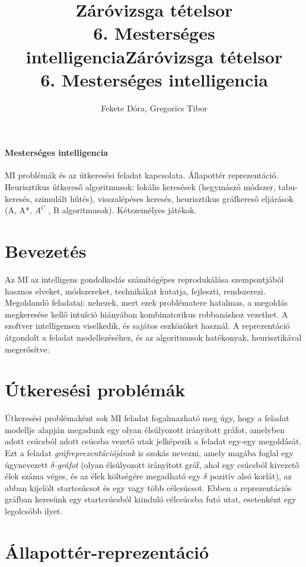 \documentclass[margin=0px]{article}
\title{Záróvizsga tételsor \\ \large 6. Mesterséges intelligencia}
\date{}
\author{Fekete Dóra, Gregorics Tibor}
\newenvironment{tetel}[1]{\paragraph{#1 \\}}{}
\begin{document}
	\title{Záróvizsga tételsor \\ \large 6. Mesterséges intelligencia}
	
	\maketitle
	
	\begin{tetel}{Mesterséges intelligencia}
			MI problémák és az útkeresési feladat kapcsolata. Állapottér reprezentáció. Heurisztikus útkereső algoritmusok: lokális keresések (hegymászó módszer, tabu-keresés, szimulált hűtés), visszalépéses keresés, heurisztikus gráfkereső eljárások (A, A*, $A^C$ , B algoritmusok). Kétszemélyes játékok.
	\end{tetel}

	\section{Bevezetés}
	
	Az MI az intelligens gondolkodás számítógépes reprodukálása szempontjából hasznos elveket, módszereket, technikákat kutatja, fejleszti, rendszerezi. Megoldandó feladatai: nehezek, mert ezek problématere hatalmas, a megoldás megkeresése kellő intuíció hiányában kombinatorikus robbanáshoz vezethet. A szoftver intelligensen viselkedik, és sajátos eszközöket használ. A reprezentáció átgondolt a feladat modellezéséhez, és az algoritmusok hatékonyak, heurisztikával megerősítve.
	
	\section{Útkeresési problémák}
	
	Útkeresési problémaként sok MI feladat fogalmazható meg úgy, hogy a feladat modellje alapján megadunk egy olyan élsúlyozott irányított gráfot, amelyben adott csúcsból adott csúcsba vezető utak jelképezik a feladat egy-egy megoldását. Ezt a feladat \textit{gráfreprezentációjának} is szokás nevezni, amely magába foglal egy úgynevezett \textit{$\delta$-gráfot} (olyan élsúlyozott irányított gráf, ahol egy csúcsból kivezető élek száma véges, és az élek költségére megadható egy $\delta$ pozitív alsó korlát), az abban kijelölt startcsúcsot és egy vagy több célcsúcsot. Ebben a reprezentációs gráfban keresünk egy startcsúcsból kiinduló célcsúcsba futó utat, esetenként egy legolcsóbb ilyet.
	
	\section{Állapottér-reprezentáció}
	
\end{document}
